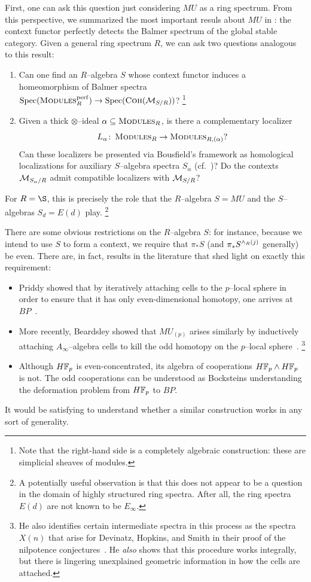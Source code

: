 First, one can ask this question just considering \(MU\) as a ring spectrum.
From this perspective, we summarized the most important resuls about \(MU\) in : the context functor perfectly detects the Balmer spectrum of the global stable category.
Given a general ring spectrum \(R\), we can ask two questions analogous to this result:
\begin{enumerate}
\item Can one find an \(R\)--algebra \(S\) whose context functor induces a homeomorphism of Balmer spectra \(\operatorname{Spec}(\normalfont\textsc{Modules}_R^{\mathrm{perf}}) \to \operatorname{Spec}(\normalfont\textsc{Coh}(\mathcal{M}_{S/R}))\)?%
      \footnote{%
      Note that the right-hand side is a completely algebraic construction: these are simplicial sheaves of modules.
      }
\item Given a thick \(\otimes\)--ideal \(\alpha \subseteq \normalfont\textsc{Modules}_R\), is there a complementary localizer \[L_\alpha\colon\thinspace \normalfont\textsc{Modules}_R \to \normalfont\textsc{Modules}_{R,(\alpha)}?\]
      Can these localizers be presented via Bousfield's framework as homological localizations for auxiliary \(S\)--algebra spectra \(S_\alpha\) (cf.\ )?
      Do the contexts \(\mathcal{M}_{S_\alpha/R}\) admit compatible localizers with \(\mathcal{M}_{S/R}\)?
\end{enumerate}
For \(R = \S\), this is precisely the role that the \(R\)--algebra \(S = MU\) and the \(S\)--algebras \(S_d = E(d)\) play.%
\footnote{%
A potentially useful observation is that this does not appear to be a question in the domain of highly structured ring spectra.
After all, the ring spectra \(E(d)\) are not known to be \(E_\infty\).
}

There are some obvious restrictions on the \(R\)--algebra \(S\): for instance, because we intend to use \(S\) to form a context, we require that \(\pi_* S\) (and \(\pi_* S^{\wedge_R (j)}\) generally) be even.
There are, in fact, results in the literature that shed light on exactly this requirement:
\begin{itemize}
    \item Priddy showed that by iteratively attaching cells to the \(p\)--local sphere in order to ensure that it has only even-dimensional homotopy, one arrives at \(BP\)~\cite{Priddy}.
    \item More recently, Beardsley showed that \(MU_{(p)}\) arises similarly by inductively attaching \(A_\infty\)--algebra cells to kill the odd homotopy on the \(p\)--local sphere~\cite{Beardsley}.%
\footnote{%
          He also identifies certain intermediate spectra in this process as the spectra \(X(n)\) that arise for Devinatz, Hopkins, and Smith in their proof of the nilpotence conjectures~\cite{DHS}.
          He \emph{also} shows that this procedure works integrally, but there is lingering unexplained geometric information in how the cells are attached.
}
    \item Although \(\HFp\) is even-concentrated, its algebra of cooperations \(\HFp \sm \HFp\) is not.
          The odd cooperations can be understood as Bocksteins understanding the deformation problem from \(\HFp\) to \(BP\).
\end{itemize}
It would be satisfying to understand whether a similar construction works in any sort of generality.

